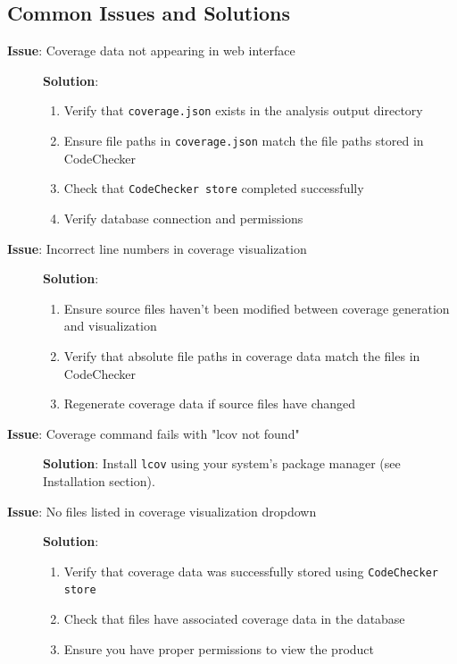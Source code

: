 \subsection{Common Issues and Solutions}

\begin{description}
    \item[\textbf{Issue}: Coverage data not appearing in web interface]
    \textbf{Solution}: 
    \begin{enumerate}
        \item Verify that \texttt{coverage.json} exists in the analysis output directory
        \item Ensure file paths in \texttt{coverage.json} match the file paths stored in CodeChecker
        \item Check that \texttt{CodeChecker store} completed successfully
        \item Verify database connection and permissions
    \end{enumerate}
    
    \item[\textbf{Issue}: Incorrect line numbers in coverage visualization]
    \textbf{Solution}: 
    \begin{enumerate}
        \item Ensure source files haven't been modified between coverage generation and visualization
        \item Verify that absolute file paths in coverage data match the files in CodeChecker
        \item Regenerate coverage data if source files have changed
    \end{enumerate}
    
    \item[\textbf{Issue}: Coverage command fails with "lcov not found"]
    \textbf{Solution}: Install \texttt{lcov} using your system's package manager (see Installation section).
    
    \item[\textbf{Issue}: No files listed in coverage visualization dropdown]
    \textbf{Solution}: 
    \begin{enumerate}
        \item Verify that coverage data was successfully stored using \texttt{CodeChecker store}
        \item Check that files have associated coverage data in the database
        \item Ensure you have proper permissions to view the product
    \end{enumerate}
    

\end{description}
